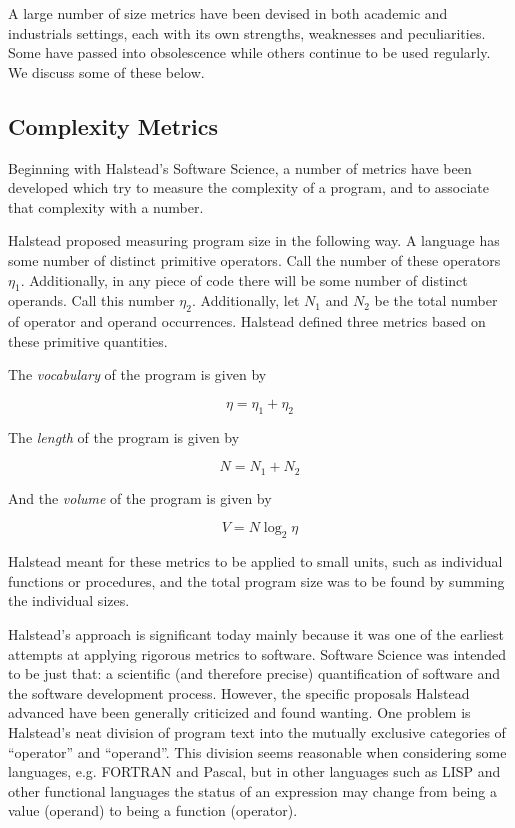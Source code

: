 A large number of size metrics have been devised in both academic and
industrials settings,  each with its own
strengths, weaknesses and peculiarities.  Some have passed into
obsolescence while others continue to be used regularly.  We discuss
some of these below.

\subsection{Complexity Metrics}

Beginning with Halstead's Software Science, a number of metrics have
been 
developed which try to measure the complexity of a program, and to 
associate that complexity with a number.  

Halstead proposed measuring program size
in the following way.  A language has some number of distinct primitive
operators.  Call the number of these operators $\eta_{1}$.  Additionally, in
any piece of code there will be some number of distinct operands.  Call this
number $\eta_{2}$.  Additionally, let $N_{1}$ and $N_{2}$ be the total 
number of operator and operand occurrences.  Halstead defined three
metrics based on these primitive quantities.  

The {\em vocabulary} of the program is given by

\[\eta = \eta_{1} + \eta_{2}\]

The {\em length} of the program is given by

\[N = N_{1} + N_{2}\]

And the {\em volume} of the program is given by

\[V = N \log_{2} \eta\]

Halstead meant for these metrics to be applied to small units, such as 
individual functions or procedures, and the total program size was to
be found by summing the individual sizes.

Halstead's approach is significant today mainly because it was one of
the earliest attempts at applying rigorous metrics to software.
Software Science was intended to be just that: a scientific (and
therefore precise) quantification of software and the software
development process.  However, the specific proposals Halstead
advanced have been generally criticized and found wanting.  One
problem \cite{Lassez} is Halstead's neat division of program text into 
the mutually exclusive categories of ``operator'' and ``operand''.
This division seems reasonable when considering some languages,
e.g. FORTRAN and Pascal, but in other languages such as LISP and other
functional languages the status of an expression may change from being 
a value (operand) to being a function (operator).

